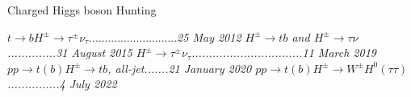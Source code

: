 \begin{multimuons-1}[enhanced, tikz={rotate=0}, width=1.0\textwidth]{\huge Charged Higgs boson Hunting}

  \Large{$t\rightarrow bH^{\pm}\rightarrow \tau^{\pm} \nu_{\tau}$}............................\it{\Large 25 May 2012}\newline
  \Large{$H^{\pm}\rightarrow tb$ and $H^{\pm}\rightarrow \tau\nu$}..............\it{\Large 31 August 2015}\newline
  \Large{$H^{\pm} \rightarrow \tau^{\pm} \nu_{\tau}$}................................\it{\Large 11 March 2019}\newline
  \Large{$pp\rightarrow t(b)H^{\pm} \rightarrow tb$, all-jet}.......\it{\Large 21 January 2020}\newline
  \Large{$pp\rightarrow t(b)H^{\pm} \rightarrow W^{\pm}H^{0}(\tau\tau)$}...............\it{\Large 4 July 2022}
\end{multimuons-1}

